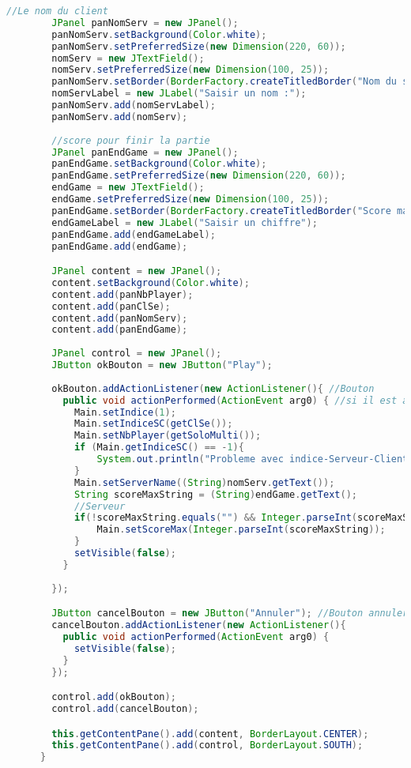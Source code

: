\begin{lstlisting}[language=Java]
	    //Le nom du client
	    JPanel panNomServ = new JPanel();
	    panNomServ.setBackground(Color.white);
	    panNomServ.setPreferredSize(new Dimension(220, 60));
	    nomServ = new JTextField();
	    nomServ.setPreferredSize(new Dimension(100, 25));
	    panNomServ.setBorder(BorderFactory.createTitledBorder("Nom du serveur adverse"));
	    nomServLabel = new JLabel("Saisir un nom :");
	    panNomServ.add(nomServLabel);
	    panNomServ.add(nomServ);
	    
	    //score pour finir la partie
	    JPanel panEndGame = new JPanel();
	    panEndGame.setBackground(Color.white);
	    panEndGame.setPreferredSize(new Dimension(220, 60));
	    endGame = new JTextField();
	    endGame.setPreferredSize(new Dimension(100, 25));
	    panEndGame.setBorder(BorderFactory.createTitledBorder("Score max"));
	    endGameLabel = new JLabel("Saisir un chiffre");
	    panEndGame.add(endGameLabel);
	    panEndGame.add(endGame);

	    JPanel content = new JPanel();
	    content.setBackground(Color.white);
	    content.add(panNbPlayer);
	    content.add(panClSe);
	    content.add(panNomServ);
	    content.add(panEndGame);
		
	    JPanel control = new JPanel();
	    JButton okBouton = new JButton("Play");
	    
	    okBouton.addActionListener(new ActionListener(){ //Bouton 
	      public void actionPerformed(ActionEvent arg0) { //si il est appuye, on associe les valeurs aux variable dans main
	    	Main.setIndice(1);
	    	Main.setIndiceSC(getClSe());
	    	Main.setNbPlayer(getSoloMulti());
	        if (Main.getIndiceSC() == -1){
	        	System.out.println("Probleme avec indice-Serveur-Client");
	        }
	        Main.setServerName((String)nomServ.getText());
	        String scoreMaxString = (String)endGame.getText();
	        //Serveur
	        if(!scoreMaxString.equals("") && Integer.parseInt(scoreMaxString) != 0){
	        	Main.setScoreMax(Integer.parseInt(scoreMaxString));
	        }
	        setVisible(false);
	      }
    
	    });

	    JButton cancelBouton = new JButton("Annuler"); //Bouton annuler
	    cancelBouton.addActionListener(new ActionListener(){
	      public void actionPerformed(ActionEvent arg0) {
	        setVisible(false);
	      }      
	    });

	    control.add(okBouton);
	    control.add(cancelBouton);

	    this.getContentPane().add(content, BorderLayout.CENTER);
	    this.getContentPane().add(control, BorderLayout.SOUTH);
	  }
  

\end{lstlisting}
